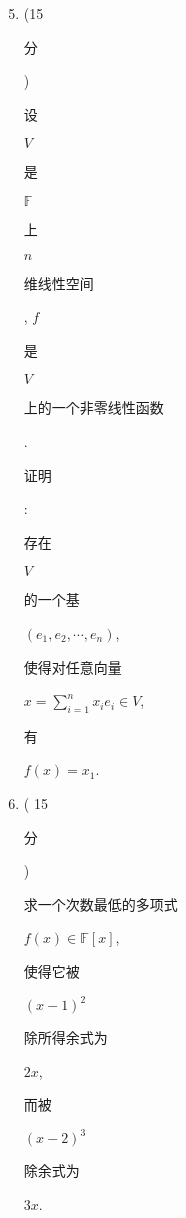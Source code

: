 \documentclass[10pt]{article}
\begin{document}
\begin{enumerate}
  \setcounter{enumi}{4}
  \item (15 \begin{CJK}{UTF8}{mj}分\end{CJK}) \begin{CJK}{UTF8}{mj}设\end{CJK} $V$ \begin{CJK}{UTF8}{mj}是\end{CJK} $\mathbb{F}$ \begin{CJK}{UTF8}{mj}上\end{CJK} $n$ \begin{CJK}{UTF8}{mj}维线性空间\end{CJK}, $f$ \begin{CJK}{UTF8}{mj}是\end{CJK} $V$ \begin{CJK}{UTF8}{mj}上的一个非零线性函数\end{CJK}. \begin{CJK}{UTF8}{mj}证明\end{CJK}: \begin{CJK}{UTF8}{mj}存在\end{CJK} $V$ \begin{CJK}{UTF8}{mj}的一个基\end{CJK} $\left(e_{1}, e_{2}, \cdots, e_{n}\right)$, \begin{CJK}{UTF8}{mj}使得对任意向量\end{CJK} $x=\sum_{i=1}^{n} x_{i} e_{i} \in V$, \begin{CJK}{UTF8}{mj}有\end{CJK} $f(x)=x_{1}$.

  \item ( 15 \begin{CJK}{UTF8}{mj}分\end{CJK}) \begin{CJK}{UTF8}{mj}求一个次数最低的多项式\end{CJK} $f(x) \in \mathbb{F}[x]$, \begin{CJK}{UTF8}{mj}使得它被\end{CJK} $(x-1)^{2}$ \begin{CJK}{UTF8}{mj}除所得余式为\end{CJK} $2 x$, \begin{CJK}{UTF8}{mj}而被\end{CJK} $(x-2)^{3}$ \begin{CJK}{UTF8}{mj}除余式为\end{CJK} $3 x$.


\end{enumerate}
\end{document}
